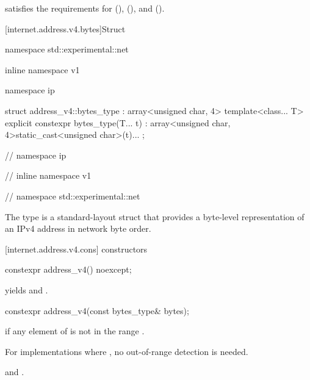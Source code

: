 \pnum
{} satisfies the requirements for  (),  (), and  ().


[internet.address.v4.bytes]{Struct }

%
\begin{codeblock}
namespace std::experimental::net {
inline namespace v1 {
namespace ip {

  struct address_v4::bytes_type : array<unsigned char, 4>
  {
    template<class... T> explicit constexpr bytes_type(T... t)
      : array<unsigned char, 4>{{static_cast<unsigned char>(t)...}} {}
  };

} // namespace ip
} // inline namespace v1
} // namespace std::experimental::net
\end{codeblock}

\pnum
The  type is a standard-layout struct that provides a byte-level representation of an IPv4 address in network byte order.



%
[internet.address.v4.cons]{ constructors}

\begin{itemdecl}
constexpr address_v4() noexcept;
\end{itemdecl}

\begin{itemdescr}
\pnum
\postconditions {} yields  and .
\end{itemdescr}

\begin{itemdecl}
constexpr address_v4(const bytes_type& bytes);
\end{itemdecl}

\begin{itemdescr}
\pnum
\remarks {} if any element of  is not in the range \tcode{[0, 0xFF]}. \begin{note} For implementations where , no out-of-range detection is needed. \end{note}

\pnum
\postconditions {} and .
\end{itemdescr}

